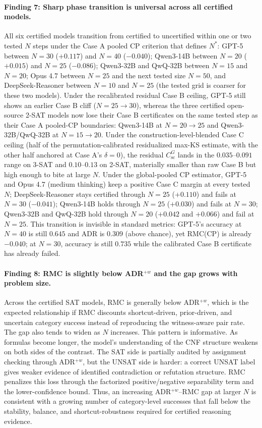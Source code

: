 \documentclass[conference]{IEEEtran}
\theoremstyle{remark}
\newcommand{\shortcutCeiling}{C_{\mathrm{sc}}^{G}}
\begin{document}
\paragraph{Finding 7: Sharp phase transition is universal across all certified models.}
All six certified models transition from certified to uncertified within one or two tested $N$ steps under the Case A pooled CP criterion that defines $N^*$:
GPT-5 between $N=30$ ($+0.117$) and $N=40$ ($-0.040$);
Qwen3-14B between $N=20$ ($+0.015$) and $N=25$ ($-0.086$);
Qwen3-32B and QwQ-32B between $N=15$ and $N=20$;
Opus 4.7 between $N=25$ and the next tested size $N=50$, and DeepSeek-Reasoner between $N=10$ and $N=25$ (the tested grid is coarser for these two models).
Under the recalibrated residual Case B ceiling, GPT-5 still shows an earlier Case B cliff ($N=25\to30$), whereas the three certified open-source 2-SAT models now lose their Case B certificates on the same tested step as their Case A pooled-CP boundaries: Qwen3-14B at $N=20\to25$ and Qwen3-32B/QwQ-32B at $N=15\to20$.
Under the construction-level-blended Case C ceiling (half of the permutation-calibrated residualized max-KS estimate, with the other half anchored at Case A's $\delta=0$), the residual $\shortcutCeiling$ lands in the $0.035$--$0.091$ range on 3-SAT and $0.10$--$0.13$ on 2-SAT, materially smaller than raw Case B but high enough to bite at large $N$.
Under the global-pooled CP estimator, GPT-5 and Opus 4.7 (medium thinking) keep a positive Case C margin at every tested $N$; DeepSeek-Reasoner stays certified through $N=25$ ($+0.110$) and fails at $N=30$ ($-0.041$); Qwen3-14B holds through $N=25$ ($+0.030$) and fails at $N=30$; Qwen3-32B and QwQ-32B hold through $N=20$ ($+0.042$ and $+0.066$) and fail at $N=25$.
This transition is invisible in standard metrics: GPT-5's accuracy at $N=40$ is still $0.645$ and ADR is $0.309$ (above chance), yet RMC(CP) is already $-0.040$; at $N=30$, accuracy is still $0.735$ while the calibrated Case B certificate has already failed.

\paragraph{Finding 8: RMC is slightly below ADR$^{+w}$ and the gap grows with problem size.}
Across the certified SAT models, RMC is generally below ADR$^{+w}$, which is the expected relationship if RMC discounts shortcut-driven, prior-driven, and uncertain category success instead of reproducing the witness-aware pair rate.  The gap also tends to widen as $N$ increases.  This pattern is informative.  As formulas become longer, the model's understanding of the CNF structure weakens on both sides of the contrast.  The SAT side is partially audited by assignment checking through ADR$^{+w}$, but the UNSAT side is harder: a correct UNSAT label gives weaker evidence of identified contradiction or refutation structure.  RMC penalizes this loss through the factorized positive/negative separability term and the lower-confidence bound.  Thus, an increasing ADR$^{+w}$--RMC gap at larger $N$ is consistent with a growing number of category-level successes that fall below the stability, balance, and shortcut-robustness required for certified reasoning evidence.
\end{document}
